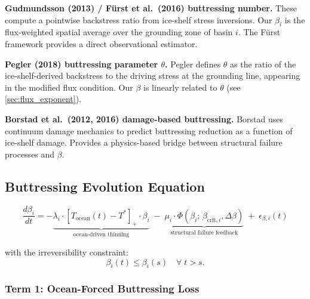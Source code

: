\documentclass[11pt]{article}
\theoremstyle{definition}
\begin{document}
\textbf{Gudmundsson (2013) / F\"{u}rst et al.\ (2016) buttressing number.}  These compute a pointwise backstress ratio from ice-shelf stress inversions.  Our $\beta_i$ is the flux-weighted spatial average over the grounding zone of basin $i$.  The F\"{u}rst framework provides a direct observational estimator.

\textbf{Pegler (2018) buttressing parameter $\theta$.}  Pegler defines $\theta$ as the ratio of the ice-shelf-derived backstress to the driving stress at the grounding line, appearing in the modified flux condition.  Our $\beta$ is linearly related to $\theta$ (see \cref{sec:flux_exponent}).

\textbf{Borstad et al.\ (2012, 2016) damage-based buttressing.}  Borstad uses continuum damage mechanics to predict buttressing reduction as a function of ice-shelf damage.  Provides a physics-based bridge between structural failure processes and $\beta$.

\subsection{Buttressing Evolution Equation}

\begin{equation}
  \boxed{
  \frac{d\beta_i}{dt} = -\underbrace{\lambda_i \cdot [T_{\text{ocean}}(t) - T^{*}]_+ \cdot \beta_i}_{\text{ocean-driven thinning}}
  \;-\; \underbrace{\mu_i \cdot \Phi(\beta_i;\, \beta_{\text{crit},i}, \Delta\beta)}_{\text{structural failure feedback}}
  \;+\; \epsilon_{\beta,i}(t)
  }
  \label{eq:dbeta_dt}
\end{equation}

with the irreversibility constraint:
\begin{equation}
  \beta_i(t) \leq \beta_i(s) \quad \forall\; t > s.
  \label{eq:irreversibility}
\end{equation}

\subsubsection{Term 1: Ocean-Forced Buttressing Loss}
\end{document}

